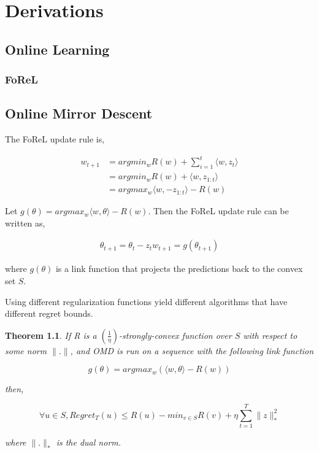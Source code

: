
\newtheorem{theorem}{Theorem}


\chapter{Derivations}

\section{Online Learning}


\subsection{FoReL}


\section{Online Mirror Descent}


The FoReL update rule is,

\begin{align*}
    w_{t+1} &= argmin_w R(w) + \sum_{i=1}^t \langle w, z_t \rangle \\
            &= argmin_w R(w) + \langle w, z_{1:t}\rangle \\
            &= argmax_w \langle w, -z_{1:t} \rangle - R(w)    
\end{align*}

Let $g(\theta) = argmax_w \langle w, \theta \rangle - R(w)$. Then the FoReL update rule can 
be written as,

\begin{align*}
    \theta_{t+1} = \theta_t - z_t
    w_{t+1} = g(\theta_{t+1})
\end{align*}

where $g(\theta)$ is a link function that projects the predictions back to the convex set $S$.

Using different regularization functions yield different algorithms that have different regret bounds.

\begin{theorem}
    If R is a $(\frac{1}{\eta})$-strongly-convex function over $S$ with respect to some norm $\|.\|$, and OMD 
    is run on a sequence with the following link function

    $$g(\theta) = argmax_w (\langle w, \theta \rangle - R(w))$$

    then,

    $$\forall u \in S, Regret_T(u) \leq R(u) - min_{v \in S} R(v) + \eta \sum_{t=1}^T \|z\|_*^2$$

    where $\|.\|_*$ is the dual norm.
\end{theorem}


